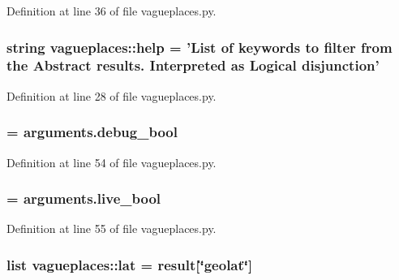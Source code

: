 \-Definition at line 36 of file vagueplaces.\-py.

\hypertarget{namespacevagueplaces_a23c662171941a2348ade72200850b133}{
\subsubsection[{help}]{\setlength{\rightskip}{0pt plus 5cm}string {\bf vagueplaces\-::help} = '\-List of keywords to filter from the \-Abstract results. \-Interpreted as \-Logical disjunction'}}\label{namespacevagueplaces_a23c662171941a2348ade72200850b133}


\-Definition at line 28 of file vagueplaces.\-py.

\hypertarget{namespacevagueplaces_a4dcc7b9604e1fd16000c4f36becf8697}{
\subsubsection[{isdebug}]{ = arguments.\-debug\-\_\-bool}}\label{namespacevagueplaces_a4dcc7b9604e1fd16000c4f36becf8697}


\-Definition at line 54 of file vagueplaces.\-py.

\hypertarget{namespacevagueplaces_ae377bfacd073c19ab35ff25f123eab1a}{
\subsubsection[{islive}]{ = arguments.\-live\-\_\-bool}}\label{namespacevagueplaces_ae377bfacd073c19ab35ff25f123eab1a}


\-Definition at line 55 of file vagueplaces.\-py.

\hypertarget{namespacevagueplaces_affe00f0ec5293de098491e2ee7a27bbf}{
\subsubsection[{lat}]{\setlength{\rightskip}{0pt plus 5cm}list {\bf vagueplaces\-::lat} = result\mbox{[}\char`\"{}geolat\char`\"{}\mbox{]}}}\label{namespacevagueplaces_affe00f0ec5293de098491e2ee7a27bbf}


